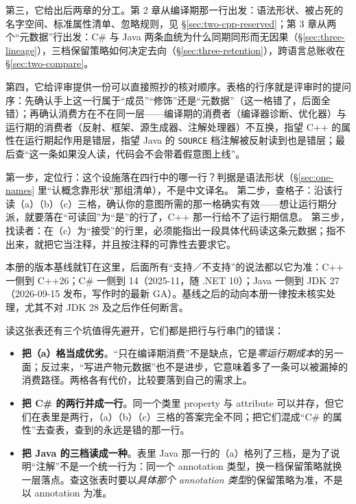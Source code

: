 \documentclass[12pt,a4paper,fontset=fandol]{ctexbook}
\newcommand{\cpp}[1]{C++#1}
\begin{document}
第三，它给出后两章的分工。第 2 章从编译期那一行出发：语法形状、被占死的名字空间、标准属性清单、忽略规则，见 \S\ref{sec:two-cpp-reserved}；第 3 章从两个“元数据”行出发：C\# 与 Java 两条血统为什么同期同形而无因果（\S\ref{sec:three-lineage}），三档保留策略如何决定去向（\S\ref{sec:three-retention}），跨语言总账收在 \S\ref{sec:two-compare}。

第四，它给评审提供一份可以直接照抄的核对顺序。表格的行序就是评审时的提问序：先确认手上这一行属于“成员”“修饰”还是“元数据”（这一格错了，后面全错）；再确认消费方在不在同一层——编译期的消费者（编译器诊断、优化器）与运行期的消费者（反射、框架、源生成器、注解处理器）不互换，指望 \cpp{} 的属性在运行期起作用是错层，指望 Java 的 \texttt{SOURCE} 档注解被反射读到也是错层；最后查“这一条如果没人读，代码会不会带着假意图上线”。

\begin{bestpractice}[title={按速查表做元数据评审的三步}]
第一步，定位行：这个设施落在四行中的哪一行？判据是语法形状（\S\ref{sec:one-names} 里“认概念靠形状”那组清单），不是中文译名。
第二步，查格子：沿该行读（a）（b）（c）三格，确认你的意图所需的那一格确实有效——想让运行期分派，就要落在“可读回”为“是”的行了，\cpp{} 那一行给不了运行期信息。
第三步，找读者：在（c）为“接受”的行里，必须能指出一段具体代码读这条元数据；指不出来，就把它当注释，并且按注释的可靠性去要求它。
\end{bestpractice}

本册的版本基线就钉在这里，后面所有“支持／不支持”的说法都以它为准：\cpp{} 一侧到 \cpp{26}；C\# 一侧到 14（2025-11，随 .NET 10）；Java 一侧到 JDK 27（2026-09-15 发布，写作时的最新 GA）。基线之后的动向本册一律按未核实处理，尤其不对 JDK 28 及之后作任何断言。

读这张表还有三个坑值得先避开，它们都是把行与行串门的错误：
\begin{itemize}
\item \textbf{把（a）格当成优劣}。“只在编译期消费”不是缺点，它是\emph{零运行期成本}的另一面；反过来，“写进产物元数据”也不是进步，它意味着多了一条可以被漏掉的消费路径。两格各有代价，比较要落到自己的需求上。
\item \textbf{把 C\# 的两行并成一行}。同一个类里 property 与 attribute 可以并存，但它们在表里是两行，（a）（b）（c）三格的答案完全不同；把它们混成“C\# 的属性”去查表，查到的永远是错的那一行。
\item \textbf{把 Java 的三档读成一种}。表里 Java 那一行的（a）格列了三档，是为了说明“注解”不是一个统一行为：同一个 annotation 类型，换一档保留策略就换一层落点。查这张表时要以\emph{具体那个 annotation 类型}的保留策略为准，不是以 annotation 为准。
\end{itemize}
\end{document}
